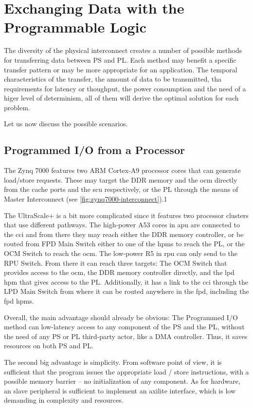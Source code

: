 \section{Exchanging Data with the Programmable Logic}

The diversity of the physical interconnect creates a number of 
possible methods for transferring data between PS and PL.
Each method may benefit a specific transfer pattern
or may be more appropriate for an application.
The temporal characteristics of the transfer,
the amount of data to be transmitted, 
tha requirements for latency or thoughput,
the power consumption and the need of a higer level of determinism,
all of them will derive the optimal solution for each problem.

Let us now discuss the possible scenarios.

\subsection{Programmed I/O from a Processor}

The Zynq 7000 features two ARM Cortex-A9 processor cores
that can generate load/store requests. These may target
the DDR memory and the \gls{ocm} directly from the cache ports
and the \gls{scu} respectively, or the PL through the means
of Master Interconnect (see \ref{fig:zynq7000-interconnect}).1

The UltraScale+ is a bit more complicated since it features
two processor clusters that use different pathways.
The high-power A53 cores in \gls{apu} are connected to the \gls{cci}
and from there they may reach either the DDR memory controller,
or be routed from FPD Main Switch either to one of the \acrlong{hpm}s to reach the PL,
or the OCM Switch to reach the \gls{ocm}.
The low-power R5 in \gls{rpu} can only send to the RPU Switch.
From there it can reach three targets: 
The OCM Switch that provides access to the \gls{ocm},
the DDR memory controller directly,
and the \gls{lpd} \gls{hpm} that gives access to the PL.
Additionally, it has a link to the \gls{cci} through the LPD Main Switch
from where it can be routed anywhere in the \acrlong{fpd}, including the \gls{fpd} \glspl{hpm}.

Overall, the main advantage should already be obvious:
The Programmed I/O method can low-latency access to any component of the PS and the PL,
without the need of any PS or PL third-party actor, like a DMA controller. Thus, it saves
resources on both PS and PL.

The second big advantage is simplicity. From software point of view, 
it is sufficient that the program issues the appropriate load / store instructions,
with a possible memory barrier -- no initialization of any component.
As for hardware, an slave peripheral is sufficient to
implement an \gls{axilite} interface, which is low demanding in complexity and resources.

